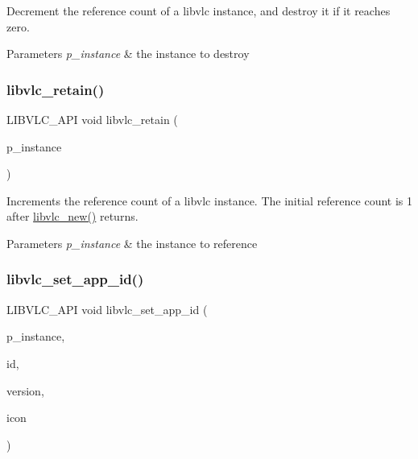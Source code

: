 Decrement the reference count of a libvlc instance, and destroy it if it reaches zero.


\begin{DoxyParams}{Parameters}
{\em p\+\_\+instance} & the instance to destroy \\
\hline
\end{DoxyParams}
\mbox{\label{group__libvlc__core_ga7a09a1aa563f098a11c0b34682a790ca}} 
\subsubsection{\texorpdfstring{libvlc\+\_\+retain()}{libvlc\_retain()}}
{\footnotesize\ttfamily L\+I\+B\+V\+L\+C\+\_\+\+A\+PI void libvlc\+\_\+retain (\begin{DoxyParamCaption}\item[{\hyperlink{group__libvlc__core_ga316d739a80da4678206c79f4d6c2e284}{libvlc\+\_\+instance\+\_\+t} $\ast$}]{p\+\_\+instance }\end{DoxyParamCaption})}

Increments the reference count of a libvlc instance. The initial reference count is 1 after \hyperlink{group__libvlc__core_ga1ecba605b37df9e62d2f8c0290ef3893}{libvlc\+\_\+new()} returns.


\begin{DoxyParams}{Parameters}
{\em p\+\_\+instance} & the instance to reference \\
\hline
\end{DoxyParams}
\mbox{\label{group__libvlc__core_ga2b5434e2f27d19df8646b8240ed719f8}} 
\subsubsection{\texorpdfstring{libvlc\+\_\+set\+\_\+app\+\_\+id()}{libvlc\_set\_app\_id()}}
{\footnotesize\ttfamily L\+I\+B\+V\+L\+C\+\_\+\+A\+PI void libvlc\+\_\+set\+\_\+app\+\_\+id (\begin{DoxyParamCaption}\item[{\hyperlink{group__libvlc__core_ga316d739a80da4678206c79f4d6c2e284}{libvlc\+\_\+instance\+\_\+t} $\ast$}]{p\+\_\+instance,  }\item[{const char $\ast$}]{id,  }\item[{const char $\ast$}]{version,  }\item[{const char $\ast$}]{icon }\end{DoxyParamCaption})}

